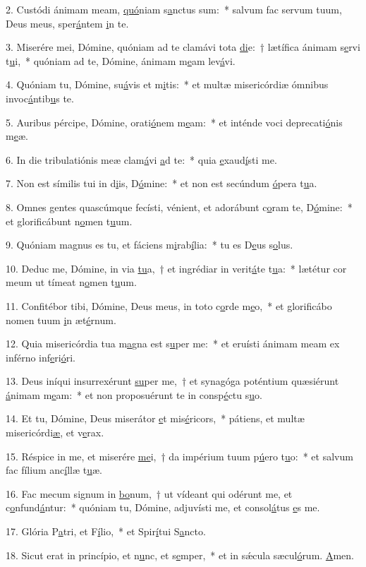 2. Custódi ánimam meam, \uline{quó}niam s\uline{a}nctus sum:~* salvum fac servum tuum, Deus meus, sper\uline{á}ntem \uline{i}n te.\par 
3. Miserére mei, Dómine, quóniam ad te clamávi tota \uline{di}e:~† lætífica ánimam s\uline{e}rvi t\uline{u}i,~* quóniam ad te, Dómine, ánimam m\uline{e}am lev\uline{á}vi.\par 
4. Quóniam tu, Dómine, su\uline{á}vis et m\uline{i}tis:~* et multæ misericórdiæ ómnibus invoc\uline{á}ntib\uline{u}s te.\par 
5. Auribus pércipe, Dómine, orati\uline{ó}nem m\uline{e}am:~* et inténde voci deprecati\uline{ó}nis m\uline{e}æ.\par 
6. In die tribulatiónis meæ clam\uline{á}vi \uline{a}d te:~* quia \uline{e}xaud\uline{í}sti me.\par 
7. Non est símilis tui in d\uline{i}is, D\uline{ó}mine:~* et non est secúndum \uline{ó}pera t\uline{u}a.\par 
8. Omnes gentes quascúmque fecísti, vénient, et adorábunt c\uline{o}ram te, D\uline{ó}mine:~* et glorificábunt n\uline{o}men t\uline{u}um.\par 
9. Quóniam magnus es tu, et fáciens m\uline{i}rab\uline{í}lia:~* tu es D\uline{e}us s\uline{o}lus.\par 
10. Deduc me, Dómine, in via \uline{tu}a,~† et ingrédiar in verit\uline{á}te t\uline{u}a:~* lætétur cor meum ut tímeat n\uline{o}men t\uline{u}um.\par 
11. Confitébor tibi, Dómine, Deus meus, in toto c\uline{o}rde m\uline{e}o,~* et glorificábo nomen tuum \uline{i}n æt\uline{é}rnum.\par 
12. Quia misericórdia tua m\uline{a}gna est s\uline{u}per me:~* et eruísti ánimam meam ex inférno inf\uline{e}ri\uline{ó}ri.\par 
13. Deus iníqui insurrexérunt \uline{su}per me,~† et synagóga poténtium quæsiérunt \uline{á}nimam m\uline{e}am:~* et non proposuérunt te in consp\uline{é}ctu s\uline{u}o.\par 
14. Et tu, Dómine, Deus miserátor \uline{e}t mis\uline{é}ricors,~* pátiens, et multæ misericórdi\uline{æ}, et v\uline{e}rax.\par 
15. Réspice in me, et miserére \uline{me}i,~† da impérium tuum p\uline{ú}ero t\uline{u}o:~* et salvum fac fílium anc\uline{í}llæ t\uline{u}æ.\par 
16. Fac mecum signum in \uline{bo}num,~† ut vídeant qui odérunt me, et c\uline{o}nfund\uline{á}ntur:~* quóniam tu, Dómine, adjuvísti me, et consol\uline{á}tus \uline{e}s me.\par 
17. Glória P\uline{a}tri, et F\uline{í}lio,~* et Spir\uline{í}tui S\uline{a}ncto.\par 
18. Sicut erat in princípio, et n\uline{u}nc, et s\uline{e}mper,~* et in sǽcula sæcul\uline{ó}rum. \uline{A}men.\par 

